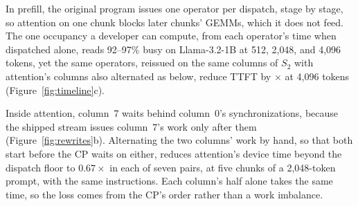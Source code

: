 In prefill, the original program issues one operator per dispatch, stage by stage, so attention on one chunk blocks later chunks' GEMMs, which it does not feed.
The one occupancy a developer can compute, from each operator's time when dispatched alone, reads 92--97\% busy on Llama-3.2-1B at 512, 2{,}048, and 4{,}096 tokens, yet the same operators, reissued on the same columns of $S_2$ with attention's columns also alternated as below, reduce TTFT by \FigOneGain$\times$ at 4{,}096 tokens (Figure~\ref{fig:timeline}c).

Inside attention, column~7 waits behind column~0's synchronizations, because the shipped stream issues column~7's work only after them (Figure~\ref{fig:rewrites}b).
Alternating the two columns' work by hand, so that both start before the CP waits on either, reduces attention's device time beyond the dispatch floor to $0.67\times$ in each of seven pairs, at five chunks of a 2{,}048-token prompt, with the same instructions.
Each column's half alone takes the same time, so the loss comes from the CP's order rather than a work imbalance.


